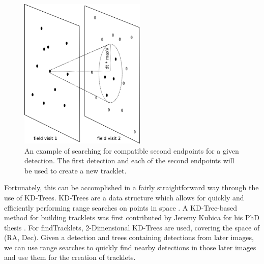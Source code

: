 \begin{figure}[ht]
  \centering
    \includegraphics[width=6cm]{illustrations/findTracklets-onequery.png}
    \caption{ An example of searching for compatible second endpoints
      for a given detection.  The first detection and each of the
      second endpoints will be used to create a new tracklet.}
\label{findTrackletsIllustrated}
\end{figure}


Fortunately, this can be
accomplished in a fairly straightforward way through the use of
KD-Trees.  KD-Trees are a data structure which allows for quickly and
efficiently performing range searches on points in space
\citep{bentley_kdtrees}.  A KD-Tree-based method for building
tracklets was first contributed by Jeremy Kubica for his PhD thesis
\citep{kubica_thesis}.  For findTracklets, 2-Dimensional KD-Trees are
used, covering the space of (RA, Dec).  Given a detection and trees
containing detections from later images, we can use range searches to
quickly find nearby detections in those later images and use them for
the creation of tracklets.

